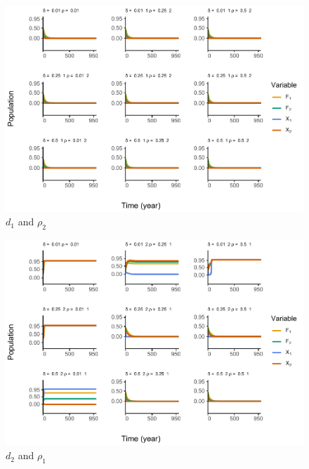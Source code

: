 \documentclass[
]{article}
\begin{document}
\begin{figure}
\centering
\includegraphics{ReviewerRhoTest_files/figure-latex/influencerho2-1.pdf}
\caption{\label{fig:influencerho2}\(d_1\) and \(\rho_2\) \label{influenceRho2}}
\end{figure}



\begin{figure}
\centering
\includegraphics{ReviewerRhoTest_files/figure-latex/influencerho3-1.pdf}
\caption{\label{fig:influencerho3}\(d_2\) and \(\rho_1\) \label{influenceRho3}}
\end{figure}
\end{document}
